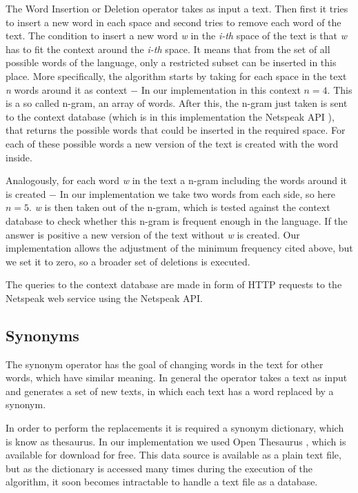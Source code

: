 \documentclass[11pt]{reportAlternative}
\begin{document}
The Word Insertion or Deletion operator takes as input a text. Then first it tries to insert a new word in each space and second tries to remove each word of the text. The condition to insert a new word \emph{w} in the \emph{i-th} space of the text is that \emph{w} has to fit the context around the \emph{i-th} space. It means that from the set of all possible words of the language, only a restricted subset can be inserted in this place. More specifically, the algorithm starts by taking for each space in the text \emph{n} words around it as context $-$ In our implementation in this context $n = 4$. This is a so called n-gram, an array of words. After this, the n-gram just taken is sent to the context database (which is in this implementation the Netspeak API \cite{Netspeak}), that returns the possible words that could be inserted in the required space. For each of these possible words a new version of the text is created with the word inside. \par

Analogously, for each word \emph{w} in the text a n-gram including the words around it is created $-$ In our implementation we take two words from each side, so here $n=5$. \emph{w} is then taken out of the n-gram, which is tested against the context database to check whether this n-gram is frequent enough in the language. If the answer is positive a new version of the text without \emph{w} is created. Our implementation allows the adjustment of the minimum frequency cited above, but we set it to zero, so a broader set of deletions is executed. \par

The queries to the context database are made in form of HTTP requests to the Netspeak web service using the Netspeak API. \par

\subsection{Synonyms}
The synonym operator has the goal of changing words in the text for other words, which have similar meaning. In general the operator takes a text as input and generates a set of new texts, in which each text has a word replaced by a synonym.

In order to perform the replacements it is required a synonym dictionary, which is know as thesaurus. In our implementation we used Open Thesaurus \cite{OpenThesuarus}, which is available for download for free. This data source is available as a plain text file, but as the dictionary is accessed many times during the execution of the algorithm, it soon becomes intractable to handle a text file as a database.
\end{document}
